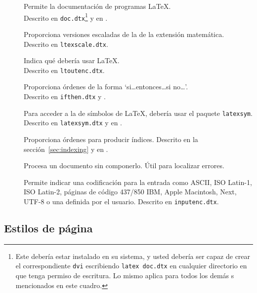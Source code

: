 \begin{table}[btp]
\caption{Algunos paquetes distribuidos con \LaTeX.} \label{packages}
\begin{lined}{\textwidth}
\begin{description}
  \item[\normalfont{}] Permite la documentación de programas \LaTeX{}.\\ Descrito en \texttt{doc.dtx}\footnote{Este \filenomo{} debería estar instalado en su sistema, y usted debería ser capaz de crear el correspondiente \texttt{dvi} escribiendo \texttt{latex doc.dtx} en cualquier directorio en que tenga permiso de escritura. Lo mismo aplica para todos los demás \filenomo{}s mencionados en este cuadro.}  y en \companion.
  \item[\normalfont{}] Proporciona versiones escaladas de la \fontnomo{} de la extensión matemática.\\ Descrito en \texttt{ltexscale.dtx}.
  \item[\normalfont{}] Indica qué  debería usar \LaTeX{}.\\ Descrito en \texttt{ltoutenc.dtx}.
  \item[\normalfont{}] Proporciona órdenes de la forma `si\ldots entonces\ldots si no\ldots'.\\ Descrito en \texttt{ifthen.dtx} y \companion.
  \item[\normalfont{}] Para acceder a la \fontnomo{} de símbolos de \LaTeX{}, debería usar el paquete \texttt{latexsym}. Descrito en \texttt{latexsym.dtx} y en \companion. 
  \item[\normalfont{}] Proporciona órdenes para producir  índices.  Descrito en la sección~\ref{sec:indexing} y en \companion.
  \item[\normalfont{}] Procesa un documento sin componerlo.  Útil para localizar errores.  
  \item[\normalfont{}] Permite indicar una codificación para la entrada como ASCII, ISO Latin-1, ISO Latin-2, páginas de código 437/850 IBM,  Apple Macintosh, Next, UTF-8 o una definida por el usuario. Descrito en \texttt{inputenc.dtx}.
\end{description}
\end{lined}
\end{table}

\subsection{Estilos de página}
 
